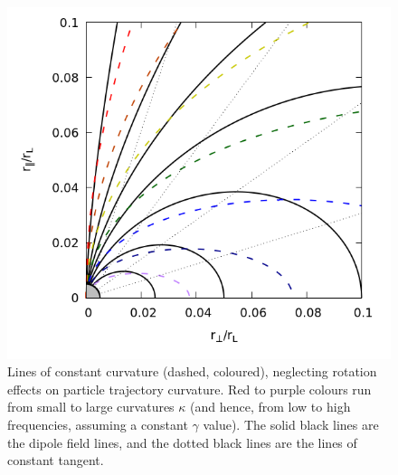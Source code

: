 \documentclass{book}
\begin{document}
\begin{figure}[!p]
    \centering
    \includegraphics[scale=0.45]{images/curvature-no-rotation.png}
    \caption{Lines of constant curvature (dashed, coloured), neglecting rotation effects on particle trajectory curvature. Red to purple colours run from small to large curvatures $\kappa$ (and hence, from low to high frequencies, assuming a constant $\gamma$ value). The solid black lines are the dipole field lines, and the dotted black lines are the lines of constant tangent.}
    \label{fig:curvature-no-rotation}
\end{figure}
\end{document}
